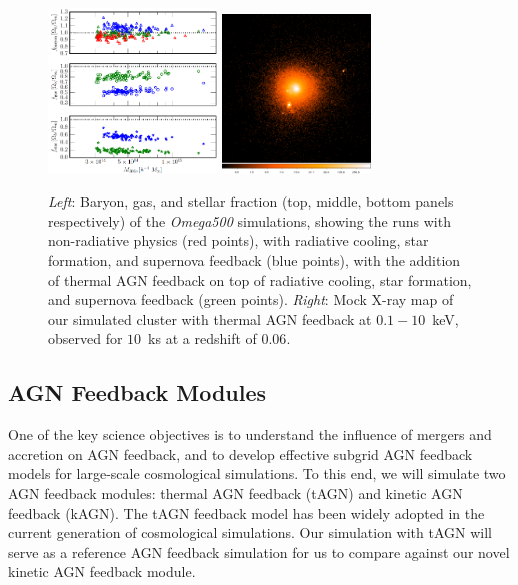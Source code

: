 \documentclass[letterpaper,11pt]{article}
\begin{document}
\begin{figure}[t]
\centering
\includegraphics[width=0.40\textwidth]{fbaryon.png}\;\;\;\;
\includegraphics[width=0.35\textwidth]{mock_chandra.png}
\caption{
{\em Left}: Baryon, gas, and stellar fraction (top, middle, bottom panels respectively) of the {\em Omega500} simulations, showing the runs with non-radiative physics (red points), with radiative cooling, star formation, and supernova feedback (blue points), with the addition of thermal AGN feedback on top of radiative cooling, star formation, and supernova feedback (green points).  
{\em Right}: Mock X-ray map of our simulated cluster with thermal AGN feedback at $0.1-10$~keV, observed for $10$~ks at a redshift of $0.06$. }  
\label{fig:sims}
\end{figure}

\subsection{AGN Feedback Modules}\label{sec:agn}

One of the key science objectives is to understand the influence of mergers and accretion on AGN feedback, and to develop effective subgrid AGN feedback models for large-scale cosmological simulations. To this end, we will simulate two AGN feedback modules: thermal AGN feedback (tAGN) and kinetic AGN feedback (kAGN). The tAGN feedback model has been widely adopted in the current generation of cosmological simulations. Our simulation with tAGN will serve as a reference AGN feedback simulation for us to compare against our novel kinetic AGN feedback module. 
\end{document}

